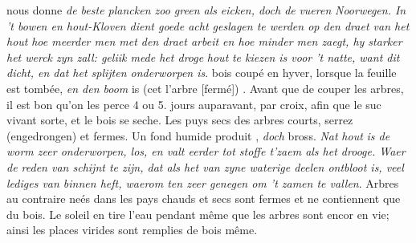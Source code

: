  nous donne \textit{de beste plancken zoo green als }\textit{eicken}\protect{}\textit{, doch de }\textit{vueren}\protect{}\textit{ Noorwegen\protect{}. In 't bowen en hout-Kloven dient goede acht geslagen te werden op den draet van het }\textit{hout}\protect{}\textit{ hoe meerder men met den draet arbeit en hoe minder men zaegt, hy starker het werck zyn zall: geliik mede het droge }\textit{hout}\protect{}\textit{ te kiezen is voor 't natte, want dit dicht, en dat het splijten onderworpen is}.  bois\protect{} coup\'{e} en hyver, lorsque la feuille est tomb\'{e}e, \textit{en den boom}  is (cet l'arbre [ferm\'{e}]) . Avant que de couper les arbres\protect{}, il est bon qu'on les perce 4 ou 5. jours auparavant, par croix, afin que le suc vivant  sorte, et le bois\protect{} se seche. 
\pend 
\pstart Les puys secs  des arbres courts, serrez (engedrongen) et fermes. Un fond humide produit , \textit{doch} bross. \textit{Nat }\textit{hout}\protect{}\textit{ is de worm zeer onderworpen, los, en valt eerder tot stoffe t'zaem als het drooge. Waer de reden van schijnt te zijn, dat als het van zyne waterige deelen ontbloot is, veel lediges van binnen heft, waerom ten zeer genegen om 't zamen te vallen}. Arbres au contraire ne\'{e}s dans les pays chauds et secs sont fermes et ne contiennent que du bois\protect{}. Le soleil en tire l'eau pendant même que les arbres sont encor en vie; ainsi les places virides sont remplies de bois\protect{} même. 
